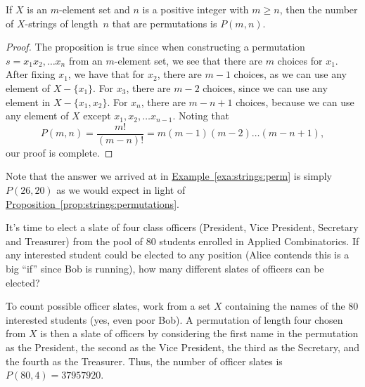 \begin{proposition}\label{prop:strings:permutations}
If $X$ is an $m$-element set and $n$ is a positive integer with $m\ge n$,
then the number of $X$-strings of length~$n$ that are permutations
is $P(m,n)$.
\end{proposition}

\begin{proof}
  The proposition is true since when constructing a permutation
  $s=x_1x_2,\dots x_n$ from an $m$-element set, we see that there are
  $m$ choices for $x_1$. After fixing $x_1$, we have that for $x_2$,
  there are $m-1$ choices, as we can use any element of
  $X-\{x_1\}$. For $x_3$, there are $m-2$ choices, since we can use
  any element in $X-\{x_1,x_2\}$. For $x_n$, there are $m-n+1$
  choices, because we can use any element of $X$ except $x_1,x_2,\dots
  x_{n-1}$. Noting that
  \[P(m,n)=\frac{m!}{(m-n)!} = m(m-1)(m-2)\dots(m-n+1),\]
  our proof is complete.
\end{proof}

Note that the answer we arrived at in
\hyperref[exa:strings:perm]{Example~\ref*{exa:strings:perm}} is simply
$P(26,20)$ as we would expect in light of
\hyperref[prop:strings:permutations]{Proposition~\ref*{prop:strings:permutations}}.

\begin{example}\label{exa:strings:officers}
  It's time to elect a slate of four class officers (President,
  Vice President, Secretary and Treasurer) from the pool of $80$
  students enrolled in Applied Combinatorics. 
  If any interested student could be elected to
  any position (Alice contends this is a big ``if'' since Bob is
  running), how many different slates of officers can be elected?

  To count possible officer slates, work from a set $X$ containing the
  names of the $80$ interested students (yes, even poor Bob). A
  permutation of length four chosen from $X$ is then a slate of
  officers by considering the first name in the permutation as the
  President, the second as the Vice President, the third as the
  Secretary, and the fourth as the Treasurer. Thus, the number of
  officer slates is $P(80,4)=37957920$.
\end{example}

